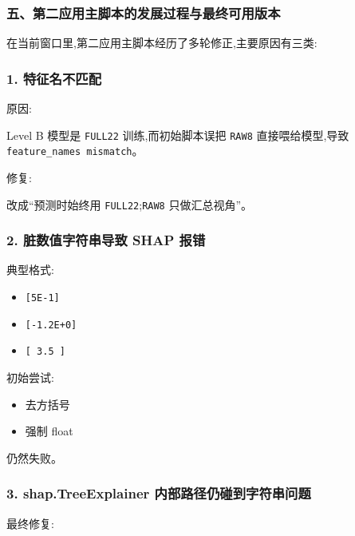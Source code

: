 \documentclass[lang=cn,scheme=chinese,color=blue,device=normal,toc=onecol,math=cm]{elegantbook}
\begin{document}
\subsubsection{五、第二应用主脚本的发展过程与最终可用版本}


在当前窗口里,第二应用主脚本经历了多轮修正,主要原因有三类:\par


\subsubsection{1. 特征名不匹配}


原因:\par


Level B 模型是 \texttt{FULL22} 训练,而初始脚本误把 \texttt{RAW8} 直接喂给模型,导致 \texttt{feature\_\allowbreak{}names mismatch}。\par


修复:\par


改成“预测时始终用 \texttt{FULL22};\texttt{RAW8} 只做汇总视角”。\par


\subsubsection{2. 脏数值字符串导致 SHAP 报错}


典型格式:\par


\begin{itemize}
\item \texttt{[5E-1]}
\item \texttt{[-1.2E+0]}
\item \texttt{[ 3.5 ]}
\end{itemize}


初始尝试:\par


\begin{itemize}
\item 去方括号
\item 强制 float
\end{itemize}


仍然失败。\par


\subsubsection{3. shap.TreeExplainer 内部路径仍碰到字符串问题}


最终修复:\par
\end{document}
